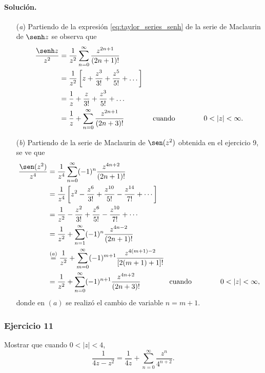 \documentclass[a4paper]{report}
\begin{document}
\paragraph{Solución.} 
\begin{enumerate}
 \item[(\textit{a})] Partiendo de la expresión \ref{eq:taylor_series_senh} de la serie de Maclaurin de \(\senh z\) se observa que 
 \begin{align*}
  \frac{\senh z}{z^2}&=\frac{1}{z^2}\sum_{n=0}^\infty\frac{z^{2n+1}}{(2n+1)!}\\
    &=\frac{1}{z^2}\left[z+\frac{z^3}{3!}+\frac{z^5}{5!}+\dots\right]\\
    &=\frac{1}{z}+\frac{z}{3!}+\frac{z^3}{5!}+\dots\\
    &=\frac{1}{z}+\sum_{n=0}^\infty\frac{z^{2n+1}}{(2n+3)!}
     \qquad\qquad\textrm{cuando}\qquad\qquad
     0<|z|<\infty.
 \end{align*}
 \item[(\textit{b})] Partiendo de la serie de Maclaurin de \(\sen(z^2)\) obtenida en el ejercicio 9, se ve que 
 \begin{align*}
  \frac{\sen(z^2)}{z^4}&=\frac{1}{z^4}\sum_{n=0}^\infty(-1)^n\frac{z^{4n+2}}{(2n+1)!}\\
   &=\frac{1}{z^4}\left[z^2-\frac{z^6}{3!}+\frac{z^{10}}{5!}-\frac{z^{14}}{7!}+\cdots\right]\\
   &=\frac{1}{z^2}-\frac{z^2}{3!}+\frac{z^6}{5!}-\frac{z^{10}}{7!}+\cdots\\
   &=\frac{1}{z^2}+\sum_{n=1}^\infty(-1)^n\frac{z^{4n-2}}{(2n+1)!}\\
   &\overset{(a)}{=}\frac{1}{z^2}+\sum_{m=0}^\infty(-1)^{m+1}\frac{z^{4(m+1)-2}}{[2(m+1)+1]!}\\
   &=\frac{1}{z^2}+\sum_{n=0}^\infty(-1)^{n+1}\frac{z^{4n+2}}{(2n+3)!}
  \qquad\qquad\textrm{cuando}\qquad\qquad
  0<|z|<\infty,
 \end{align*}
 donde en \((a)\) se realizó el cambio de variable \(n=m+1\).
\end{enumerate} 
 
\subsubsection*{Ejercicio 11} 
 
Mostrar que cuando \(0<|z|<4\),
\[
 \frac{1}{4z-z^2}=\frac{1}{4z}+\sum_{n=0}^\infty\frac{z^n}{4^{n+2}}.
\]
\end{document}
